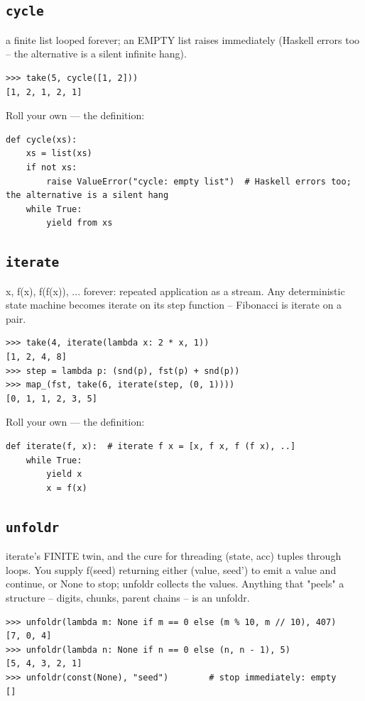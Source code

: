 \documentclass[10pt,letterpaper]{book}
\begin{document}
\subsection{\texttt{cycle}}\label{def:cycle}
a finite list looped forever; an EMPTY list raises immediately (Haskell errors too -- the alternative is a silent infinite hang).
\begin{lstlisting}[style=ex]
>>> take(5, cycle([1, 2]))
[1, 2, 1, 2, 1]
\end{lstlisting}

Roll your own --- the definition:

\begin{lstlisting}[style=ex]
def cycle(xs):
    xs = list(xs)
    if not xs:
        raise ValueError("cycle: empty list")  # Haskell errors too; the alternative is a silent hang
    while True:
        yield from xs
\end{lstlisting}

\subsection{\texttt{iterate}}\label{def:iterate}
x, f(x), f(f(x)), ... forever: repeated application as a stream. Any deterministic state machine becomes iterate on its step function -- Fibonacci is iterate on a pair.
\begin{lstlisting}[style=ex]
>>> take(4, iterate(lambda x: 2 * x, 1))
[1, 2, 4, 8]
>>> step = lambda p: (snd(p), fst(p) + snd(p))
>>> map_(fst, take(6, iterate(step, (0, 1))))
[0, 1, 1, 2, 3, 5]
\end{lstlisting}

Roll your own --- the definition:

\begin{lstlisting}[style=ex]
def iterate(f, x):  # iterate f x = [x, f x, f (f x), ..]
    while True:
        yield x
        x = f(x)
\end{lstlisting}

\subsection{\texttt{unfoldr}}\label{def:unfoldr}
iterate's FINITE twin, and the cure for threading (state, acc) tuples through loops. You supply f(seed) returning either (value, seed') to emit a value and continue, or None to stop; unfoldr collects the values. Anything that "peels" a structure -- digits, chunks, parent chains -- is an unfoldr.
\begin{lstlisting}[style=ex]
>>> unfoldr(lambda m: None if m == 0 else (m % 10, m // 10), 407)
[7, 0, 4]
>>> unfoldr(lambda n: None if n == 0 else (n, n - 1), 5)
[5, 4, 3, 2, 1]
>>> unfoldr(const(None), "seed")        # stop immediately: empty
[]
\end{lstlisting}
\end{document}
